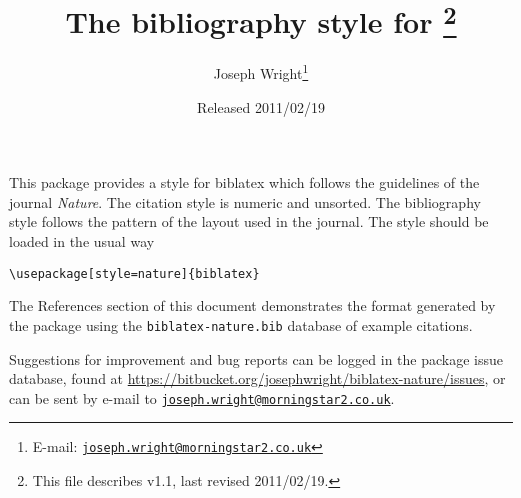 \documentclass[a4paper]{article}
\author{Joseph Wright\thanks{E-mail: 
  \href{mailto:joseph.wright@morningstar2.co.uk}
  {\texttt{joseph.wright@morningstar2.co.uk}}}}
\title{The \pkg{nature} bibliography style for \pkg{biblatex}%
  \footnote{This file describes v1.1, last revised 2011/02/19.}}
\date{Released 2011/02/19}
\providecommand*\pkg[1]{\textsf{#1}}
\begin{document}
\maketitle

This package provides a style for \pkg{biblatex} which follows the
guidelines of the journal \emph{Nature}. The citation style is numeric
and unsorted. The bibliography style follows the pattern of the layout
used in the journal. The style should be loaded in the usual way
\begin{verbatim}
\usepackage[style=nature]{biblatex}
\end{verbatim}
The References section of this document demonstrates the format 
generated by the package using the \texttt{biblatex-nature.bib} database
of example citations.

Suggestions for improvement and bug reports can be logged in the package
issue database, found at
\url{https://bitbucket.org/josephwright/biblatex-nature/issues}, or can
be sent by e-mail to 
\href{mailto:joseph.wright@morningstar2.co.uk}
  {\texttt{joseph.wright@morningstar2.co.uk}}.

\nocite{*}

\printbibliography
\end{document}
